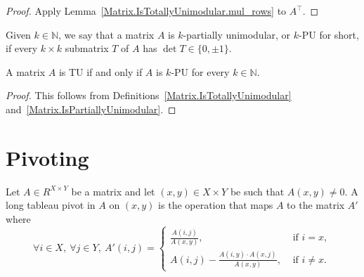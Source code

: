 \begin{proof}
    \leanok
    Apply Lemma~\ref{Matrix.IsTotallyUnimodular.mul_rows} to $A^{\top}$.
\end{proof}

\begin{definition}
    \label{Matrix.IsPartiallyUnimodular}
    \leanok
    Given $k \in \mathbb{N}$, we say that a matrix $A$ is $k$-partially unimodular, or $k$-PU for short, if every $k \times k$ submatrix $T$ of $A$ has $\det T \in \{0, \pm 1\}$.
\end{definition}

\begin{lemma}
    \label{Matrix.isTotallyUnimodular_iff_forall_isPartiallyUnimodular}
    \leanok
    A matrix $A$ is TU if and only if $A$ is $k$-PU for every $k \in \mathbb{N}$.
\end{lemma}

\begin{proof}
    \leanok
    This follows from Definitions~\ref{Matrix.IsTotallyUnimodular} and~\ref{Matrix.IsPartiallyUnimodular}.
\end{proof}


\section{Pivoting}


\begin{definition}
    \label{Matrix.longTableauPivot}
    \leanok
    Let $A \in R^{X \times Y}$ be a matrix and let $(x, y) \in X \times Y$ be such that $A (x, y) \neq 0$. A long tableau pivot in $A$ on $(x, y)$ is the operation that maps $A$ to the matrix $A'$ where
    \[
        \forall i \in X, \ \forall j \in Y, \ A' (i, j) = \begin{cases}
            \frac{A (i, j)}{A (x, y)}, & \text{ if } i = x, \\
            A (i, j) - \frac{A (i, y) \cdot A (x, j)}{A (x, y)}, & \text{ if } i \neq x.
        \end{cases}
        \]
    \end{definition}

